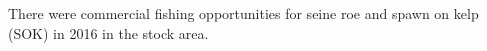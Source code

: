 There were commercial fishing opportunities for seine roe and spawn on kelp (SOK) in 2016 in the \regionName{} \regionType{} stock area.